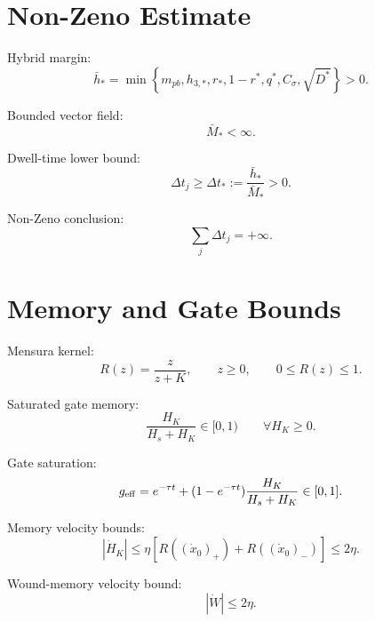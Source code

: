 \documentclass[11pt,a4paper]{article}
\theoremstyle{plain}
\theoremstyle{definition}
\theoremstyle{remark}
\begin{document}
\section{Non-Zeno Estimate}

Hybrid margin:
\begin{equation}
  \bar h_*=
  \min\left\{m_{pb},h_{3,*},r_*,1-r^*,q^*,C_\sigma,\sqrt{D^*}\right\}>0.
\end{equation}

Bounded vector field:
\begin{equation}
  \bar M_*<\infty.
\end{equation}

Dwell-time lower bound:
\begin{equation}
  \Delta t_j\ge \Delta t_*:=\frac{\bar h_*}{\bar M_*}>0.
\end{equation}

Non-Zeno conclusion:
\begin{equation}
  \sum_j \Delta t_j=+\infty.
\end{equation}

\section{Memory and Gate Bounds}

Mensura kernel:
\begin{equation}
  R(z)=\frac{z}{z+K},
  \qquad
  z\ge0,
  \qquad
  0\le R(z)\le1.
\end{equation}

Saturated gate memory:
\begin{equation}
  \frac{H_K}{H_s+H_K}\in[0,1)
  \qquad
  \forall H_K\ge0.
\end{equation}

Gate saturation:
\begin{equation}
  g_{\rm eff}=e^{-\tau t}+(1-e^{-\tau t})\frac{H_K}{H_s+H_K}\in[0,1].
\end{equation}

Memory velocity bounds:
\begin{equation}
  |\dot H_K|\le \eta\left[R((\dot x_0)_+)+R((\dot x_0)_-)\right]\le 2\eta.
\end{equation}

Wound-memory velocity bound:
\begin{equation}
  |\dot W|\le2\eta.
\end{equation}
\end{document}
